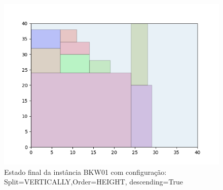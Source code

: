 \begin{figure}[H]
    \centering
    \caption[]{Estado final da instância BKW01 com configuração: Split=VERTICALLY,Order=HEIGHT, descending=True}
    \label{fig:bkw01-vertically-height-true}
    \includegraphics[scale=0.5]{output/figures/bkw/bkw01/vertically/height/true/00}
\end{figure}